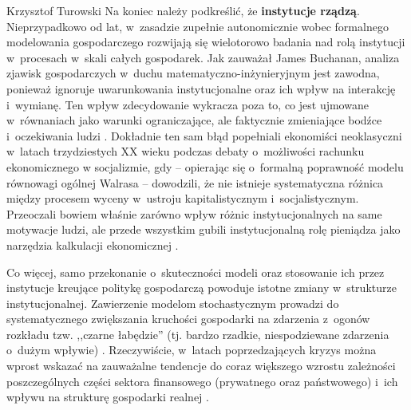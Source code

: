 \begin{artplenv}{Krzysztof Turowski}
Na koniec należy podkreślić, że \textbf{instytucje rządzą}. Nieprzypadkowo od lat, w~zasadzie zupełnie autonomicznie
wobec formalnego modelowania gospodarczego rozwijają się wielotorowo badania nad rolą instytucji w~procesach w~skali
całych gospodarek. Jak zauważał James Buchanan, analiza zjawisk gospodarczych w~duchu matematyczno-inżynieryjnym jest
zawodna, ponieważ ignoruje uwarunkowania instytucjonalne oraz ich wpływ na interakcję i~wymianę. Ten wpływ zdecydowanie
wykracza poza to, co jest ujmowane w~równaniach jako warunki ograniczające, ale faktycznie zmieniające
bodźce i~oczekiwania ludzi
\parencite{buchanan_economists_2009}.
Dokładnie ten sam błąd popełniali ekonomiści neoklasyczni
w~latach trzydziestych XX wieku podczas debaty o~możliwości rachunku ekonomicznego w socjalizmie, gdy  --  opierając się o~formalną
poprawność modelu równowagi ogólnej Walrasa  --  dowodzili, że nie istnieje systematyczna różnica między procesem
wyceny w~ustroju kapitalistycznym i~socjalistycznym. Przeoczali bowiem właśnie zarówno wpływ różnic instytucjonalnych
na same motywacje ludzi, ale przede wszystkim gubili instytucjonalną rolę pieniądza jako narzędzia kalkulacji
ekonomicznej
\parencite{mises_ludzkie_2007,mises_kalkulacja_2011}.

Co więcej, samo przekonanie o~skuteczności modeli oraz stosowanie ich przez instytucje kreujące politykę gospodarczą
powoduje istotne zmiany w~strukturze instytucjonalnej. Zawierzenie modelom stochastycznym prowadzi do systematycznego
zwiększania kruchości gospodarki na zdarzenia z~ogonów rozkładu tzw. ,,czarne łabędzie'' (tj. bardzo rzadkie,
niespodziewane zdarzenia o~dużym wpływie)
\parencite{taleb_antykruchosc:_2013}.
Rzeczywiście, w~latach poprzedzających
kryzys można wprost wskazać na zauważalne tendencje do coraz większego wzrostu zależności poszczególnych części
sektora finansowego (prywatnego oraz państwowego) i~ich wpływu na strukturę gospodarki realnej
\parencite{jablecki_financial_2016}.


\end{artplenv}
